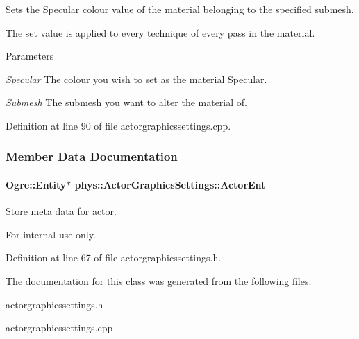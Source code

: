 Sets the Specular colour value of the material belonging to the specified submesh. 

The set value is applied to every technique of every pass in the material. 
\begin{DoxyParams}{Parameters}
\item[{\em Specular}]The colour you wish to set as the material Specular. \item[{\em Submesh}]The submesh you want to alter the material of. \end{DoxyParams}


Definition at line 90 of file actorgraphicssettings.cpp.



\subsubsection{Member Data Documentation}
\hypertarget{classphys_1_1ActorGraphicsSettings_a256f2b713dbfe39007708600e58bf2f7}{
\paragraph[{ActorEnt}]{\setlength{\rightskip}{0pt plus 5cm}Ogre::Entity$\ast$ {\bf phys::ActorGraphicsSettings::ActorEnt}}\hfill}
\label{dd/dd6/classphys_1_1ActorGraphicsSettings_a256f2b713dbfe39007708600e58bf2f7}


Store meta data for actor. 

\begin{DoxyInternal}{For internal use only.}
\end{DoxyInternal}


Definition at line 67 of file actorgraphicssettings.h.



The documentation for this class was generated from the following files:\begin{DoxyCompactItemize}
\item 
actorgraphicssettings.h\item 
actorgraphicssettings.cpp\end{DoxyCompactItemize}
